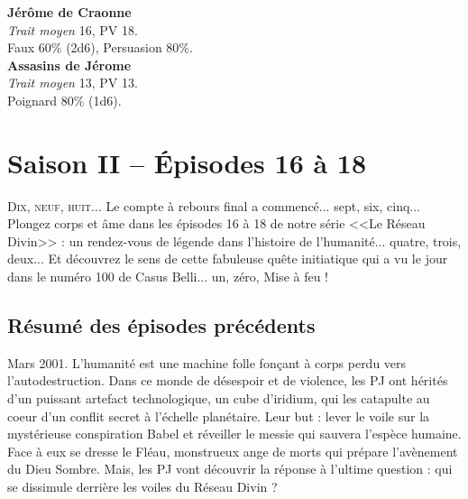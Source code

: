\documentclass[11pt,twoside,a4paper]{book}
\begin{document}
\textbf{J{\'e}r{\^o}me de Craonne}~\\
\emph{Trait moyen} 16, PV 18.~\\
Faux 60\% (2d6), Persuasion 80\%.~\\

\textbf{Assasins de J{\'e}rome}~\\
\emph{Trait moyen} 13, PV 13.~\\
Poignard 80\% (1d6).~\\

\clearpage

\chapter*{Saison II -- {\'E}pisodes 16 {\`a} 18}

\lettrine{D}{ix, neuf, huit...} Le compte {\`a} rebours final a commenc{\'e}... sept, six, cinq... Plongez corps et {\^a}me dans les {\'e}pisodes 16 {\`a} 18 de notre s{\'e}rie <<Le R{\'e}seau Divin>> : un rendez-vous de l{\'e}gende dans l'histoire de l'humanit{\'e}... quatre, trois, deux... Et d{\'e}couvrez le sens de cette fabuleuse qu{\^e}te initiatique qui a vu le jour dans le num{\'e}ro 100 de Casus Belli... un, z{\'e}ro, Mise {\`a} feu ! %

\section*{R{\'e}sum{\'e} des {\'e}pisodes pr{\'e}c{\'e}dents}

Mars 2001. L'humanit{\'e} est une machine folle fon\c{c}ant {\`a} corps perdu vers l'autodestruction. Dans ce monde de d{\'e}sespoir et de violence, les PJ ont h{\'e}rit{\'e}s d'un puissant artefact technologique, un cube d'iridium, qui les catapulte au coeur d'un conflit secret {\`a} l'{\'e}chelle plan{\'e}taire. Leur but : lever le voile sur la myst{\'e}rieuse conspiration Babel et r{\'e}veiller le messie qui sauvera l'esp{\`e}ce humaine. Face {\`a} eux se dresse le Fl{\'e}au, monstrueux ange de morts qui pr{\'e}pare l'av{\`e}nement du Dieu Sombre. Mais, les PJ vont d{\'e}couvrir la r{\'e}ponse {\`a} l'ultime question : qui se dissimule derri{\`e}re les voiles du R{\'e}seau Divin ? %
\end{document}
